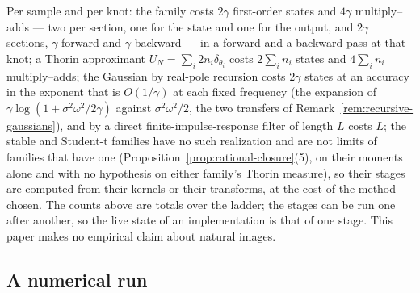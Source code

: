 \begin{remark}[costs]\label{rem:costs}
Per sample and per knot: the \Matern{} family costs $2\gamma$ first-order states and $4\gamma$
multiply--adds --- two per section, one for the state and one for the output, and $2\gamma$
sections, $\gamma$ forward and $\gamma$ backward --- in a forward and a backward pass at that knot;
a Thorin approximant $U_N = \sum_i 2n_i\delta_{\theta_i}$ costs $2\sum_i n_i$ states and
$4\sum_i n_i$ multiply--adds; the Gaussian by
real-pole recursion costs $2\gamma$ states at an accuracy in the exponent that is $O(1/\gamma)$ at each
fixed frequency (the expansion of $\gamma\log(1 + \sigma^2\omega^2/2\gamma)$ against
$\sigma^2\omega^2/2$, the two transfers of Remark~\ref{rem:recursive-gaussians}), and by a direct
finite-impulse-response filter of length $L$ costs $L$; the stable and Student-t families have
no such realization and are not limits of families that have one
(Proposition~\ref{prop:rational-closure}(5), on their moments alone and with no hypothesis on
either family's Thorin measure), so their stages are computed from their kernels or their
transforms, at the cost of the method chosen. The counts above are totals over the ladder; the
stages can be run one after another, so the live state of an implementation is that of one
stage. This paper makes no empirical
claim about natural images.
\end{remark}

\subsection{A numerical run}\label{sec:numerical-run}

